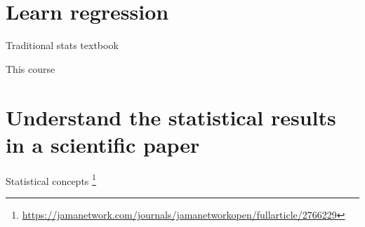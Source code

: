 \documentclass{beamer}\usepackage[]{graphicx}\usepackage[]{color}
\begin{document}
\section{Learn regression}


\begin{frame}{Traditional stats textbook}
\end{frame}


\begin{frame}{This course}
\end{frame}


\section{Understand the statistical results in a scientific paper}

\begin{frame}{Statistical concepts}
\footnote{\footnotesize \url{https://jamanetwork.com/journals/jamanetworkopen/fullarticle/2766229}}
\end{frame}
\end{document}
